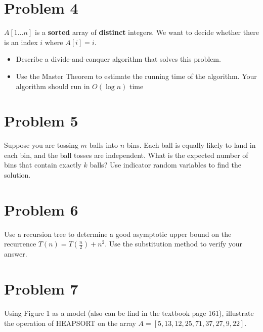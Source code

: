 \documentclass{article}
\begin{document}
\section*{Problem 4}
$A[1...n]$ is a \textbf{sorted} array of \textbf{distinct} integers. We want to decide whether there is an index $i$ where $A[i] = i$.

\begin{itemize}
\item Describe a divide-and-conquer algorithm that solves this problem.
\item Use the Master Theorem to estimate the running time of the algorithm. Your algorithm should run in $O(\log n)$ time
\end{itemize}


\section*{Problem 5}
Suppose you are tossing $m$ balls into $n$ bins. Each ball is equally likely to land in each bin, and the ball tosses are independent. What is the expected number of bins that contain exactly $k$ balls? Use indicator random variables to find the solution.


\section*{Problem 6}
Use a recursion tree to determine a good asymptotic upper bound on the recurrence
$T(n) = T(\frac{n}{2}) + n^2$. Use the substitution method to verify your answer.


\section*{Problem 7}
Using Figure 1 as a model (also can be find in the textbook page 161), illustrate the operation of HEAPSORT on the array
$A=[5, 13, 12, 25, 71, 37, 27, 9, 22]$.
%
\end{document}
